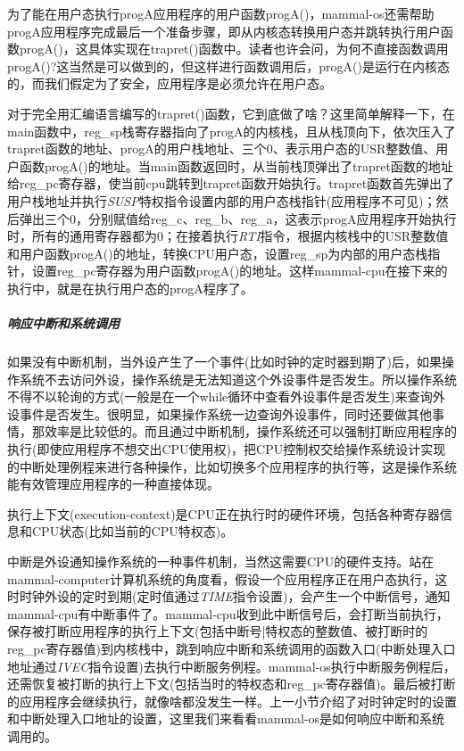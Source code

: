 为了能在用户态执行progA应用程序的用户函数progA()，mammal-os还需帮助progA应用程序完成最后一个准备步骤，即从内核态转换用户态并跳转执行用户函数progA()，这具体实现在trapret()函数中。读者也许会问，为何不直接函数调用progA()?这当然是可以做到的，但这样进行函数调用后，progA()是运行在内核态的，而我们假定为了安全，应用程序是必须允许在用户态。

对于完全用汇编语言编写的trapret()函数，它到底做了啥？这里简单解释一下，在main函数中，reg\_sp栈寄存器指向了progA的内核栈，且从栈顶向下，依次压入了trapret函数的地址、progA的用户栈地址、三个0、表示用户态的USR整数值、用户函数progA()的地址。当main函数返回时，从当前栈顶弹出了trapret函数的地址给reg\_pc寄存器，使当前cpu跳转到trapret函数开始执行。trapret函数首先弹出了用户栈地址并执行\textit{SUSP}特权指令设置内部的用户态栈指针(应用程序不可见)；然后弹出三个0，分别赋值给reg\_c、reg\_b、reg\_a，这表示progA应用程序开始执行时，所有的通用寄存器都为0；在接着执行\textit{RTI}指令，根据内核栈中的USR整数值和用户函数progA()的地址，转换CPU用户态，设置reg\_sp为内部的用户态栈指针，设置reg\_pc寄存器为用户函数progA()的地址。这样mammal-cpu在接下来的执行中，就是在执行用户态的progA程序了。

\subparagraph{响应中断和系统调用}\label{dointr}

如果没有中断机制，当外设产生了一个事件(比如时钟的定时器到期了)后，如果操作系统不去访问外设，操作系统是无法知道这个外设事件是否发生。所以操作系统不得不以轮询的方式(一般是在一个while循环中查看外设事件是否发生)来查询外设事件是否发生。很明显，如果操作系统一边查询外设事件，同时还要做其他事情，那效率是比较低的。而且通过中断机制，操作系统还可以强制打断应用程序的执行(即使应用程序不想交出CPU使用权)，把CPU控制权交给操作系统设计实现的中断处理例程来进行各种操作，比如切换多个应用程序的执行等，这是操作系统能有效管理应用程序的一种直接体现。

\begin{note} 
执行上下文(execution-context)是CPU正在执行时的硬件环境，包括各种寄存器信息和CPU状态(比如当前的CPU特权态)。
\end{note} 

中断是外设通知操作系统的一种事件机制，当然这需要CPU的硬件支持。站在mammal-computer计算机系统的角度看，假设一个应用程序正在用户态执行，这时时钟外设的定时到期(定时值通过\textit{TIME}指令设置)，会产生一个中断信号，通知mammal-cpu有中断事件了。mammal-cpu收到此中断信号后，会打断当前执行，保存被打断应用程序的执行上下文(包括中断号|特权态的整数值、被打断时的reg\_pc寄存器值)到内核栈中，跳到响应中断和系统调用的函数入口(中断处理入口地址通过\textit{IVEC}指令设置)去执行中断服务例程。mammal-os执行中断服务例程后，还需恢复被打断的执行上下文(包括当时的特权态和reg\_pc寄存器值)。最后被打断的应用程序会继续执行，就像啥都没发生一样。上一小节介绍了对时钟定时的设置和中断处理入口地址的设置，这里我们来看看mammal-os是如何响应中断和系统调用的。

